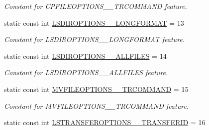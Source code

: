 \begin{DoxyCompactItemize}
\begin{DoxyCompactList}\small\item\em Constant for CPFILEOPTIONS\_\-\_\-TRCOMMAND feature. \item\end{DoxyCompactList}\item 
\hypertarget{classFMS__Data_1_1FMS__DataPackage_a0dc635f94a28067d25fa9b964207aeb4}{
static const int \hyperlink{classFMS__Data_1_1FMS__DataPackage_a0dc635f94a28067d25fa9b964207aeb4}{LSDIROPTIONS\_\-\_\-LONGFORMAT} = 13}
\label{classFMS__Data_1_1FMS__DataPackage_a0dc635f94a28067d25fa9b964207aeb4}

\begin{DoxyCompactList}\small\item\em Constant for LSDIROPTIONS\_\-\_\-LONGFORMAT feature. \item\end{DoxyCompactList}\item 
\hypertarget{classFMS__Data_1_1FMS__DataPackage_a2a8bfd3bfd6d9e82559c3b6b6e915b58}{
static const int \hyperlink{classFMS__Data_1_1FMS__DataPackage_a2a8bfd3bfd6d9e82559c3b6b6e915b58}{LSDIROPTIONS\_\-\_\-ALLFILES} = 14}
\label{classFMS__Data_1_1FMS__DataPackage_a2a8bfd3bfd6d9e82559c3b6b6e915b58}

\begin{DoxyCompactList}\small\item\em Constant for LSDIROPTIONS\_\-\_\-ALLFILES feature. \item\end{DoxyCompactList}\item 
\hypertarget{classFMS__Data_1_1FMS__DataPackage_aaccce0bc2382836577c27e2678791511}{
static const int \hyperlink{classFMS__Data_1_1FMS__DataPackage_aaccce0bc2382836577c27e2678791511}{MVFILEOPTIONS\_\-\_\-TRCOMMAND} = 15}
\label{classFMS__Data_1_1FMS__DataPackage_aaccce0bc2382836577c27e2678791511}

\begin{DoxyCompactList}\small\item\em Constant for MVFILEOPTIONS\_\-\_\-TRCOMMAND feature. \item\end{DoxyCompactList}\item 
\hypertarget{classFMS__Data_1_1FMS__DataPackage_a93d0ada294450382ad23b6c2fc9a1569}{
static const int \hyperlink{classFMS__Data_1_1FMS__DataPackage_a93d0ada294450382ad23b6c2fc9a1569}{LSTRANSFEROPTIONS\_\-\_\-TRANSFERID} = 16}
\label{classFMS__Data_1_1FMS__DataPackage_a93d0ada294450382ad23b6c2fc9a1569}


\end{DoxyCompactItemize}

